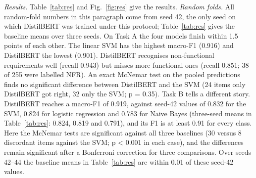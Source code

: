 \documentclass[conference,10pt,letterpaper]{IEEEtran}
\begin{document}
\emph{Results.} Table~\ref{tab:res} and Fig.~\ref{fig:res} give the results. \emph{Random folds.} All random-fold numbers in this paragraph come from seed 42, the only seed on which DistilBERT was trained under this protocol; Table~\ref{tab:res} gives the baseline means over three seeds. On Task A the four models finish within 1.5 points of each other. The linear SVM has the highest macro-F1 (0.916) and DistilBERT the lowest (0.901). DistilBERT recognises non-functional requirements well (recall 0.943) but misses more functional ones (recall 0.851; 38 of 255 were labelled NFR). An exact McNemar test on the pooled predictions finds no significant difference between DistilBERT and the SVM (24 items only DistilBERT got right, 32 only the SVM; p = 0.35). Task B tells a different story. DistilBERT reaches a macro-F1 of 0.919, against seed-42 values of 0.832 for the SVM, 0.824 for logistic regression and 0.783 for Naive Bayes (three-seed means in Table~\ref{tab:res}: 0.824, 0.819 and 0.791), and its F1 is at least 0.91 for every class. Here the McNemar tests are significant against all three baselines (30 versus 8 discordant items against the SVM; p \textless{} 0.001 in each case), and the differences remain significant after a Bonferroni correction for three comparisons. Over seeds 42–44 the baseline means in Table~\ref{tab:res} are within 0.01 of these seed-42 values.
\end{document}
